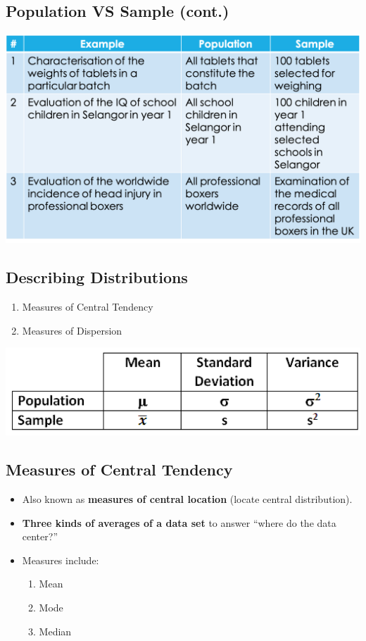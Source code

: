 \documentclass[]{article}
\providecommand{\tightlist}{%
  \setlength{\itemsep}{0pt}\setlength{\parskip}{0pt}}
\begin{document}
\hypertarget{population-vs-sample-cont.-2}{%
\subsection{Population VS Sample
(cont.)}\label{population-vs-sample-cont.-2}}

\includegraphics[width=0.8\linewidth]{figure/PopNSam2}

\hypertarget{describing-distributions}{%
\subsection{Describing Distributions}\label{describing-distributions}}

\begin{enumerate}
\def\labelenumi{\arabic{enumi}.}
\tightlist
\item
  Measures of Central Tendency
\item
  Measures of Dispersion
\end{enumerate}

\includegraphics[width=0.95\linewidth]{figure/Ch1-symbols}

\hypertarget{measures-of-central-tendency}{%
\subsection{Measures of Central
Tendency}\label{measures-of-central-tendency}}

\begin{itemize}
\item
  Also known as {\textbf{measures of central location}} (locate central
  distribution).
\item
  {\textbf{Three kinds of averages of a data set}} to answer ``where do
  the data center?''
\item
  Measures include:

  \begin{enumerate}
  \def\labelenumi{\arabic{enumi}.}
  \tightlist
  \item
    Mean
  \item
    Mode
  \item
    Median
  \end{enumerate}
\end{itemize}
\end{document}
